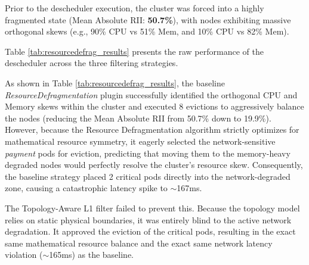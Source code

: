 Prior to the descheduler execution, the cluster was forced into a highly fragmented state (Mean Absolute RII: \textbf{50.7\%}), with nodes exhibiting massive orthogonal skews (e.g., 90\% CPU vs 51\% Mem, and 10\% CPU vs 82\% Mem).

Table \ref{tab:resourcedefrag_results} presents the raw performance of the descheduler across the three filtering strategies.
\begin{table}[H]
    \centering
    \caption{Descheduler Performance: ResourceDefragmentation Scenario}
    \label{tab:resourcedefrag_results}
\end{table}

As shown in Table \ref{tab:resourcedefrag_results}, the baseline \textit{ResourceDefragmentation} plugin successfully identified the orthogonal CPU and Memory skews within the cluster and executed 8 evictions to aggressively balance the nodes (reducing the Mean Absolute RII from 50.7\% down to 19.9\%). However, because the Resource Defragmentation algorithm strictly optimizes for mathematical resource symmetry, it eagerly selected the network-sensitive \textit{payment} pods for eviction, predicting that moving them to the memory-heavy degraded nodes would perfectly resolve the cluster's resource skew. Consequently, the baseline strategy placed 2 critical pods directly into the network-degraded zone, causing a catastrophic latency spike to $\sim$167ms. 

The Topology-Aware L1 filter failed to prevent this. Because the topology model relies on static physical boundaries, it was entirely blind to the active network degradation. It approved the eviction of the critical pods, resulting in the exact same mathematical resource balance and the exact same network latency violation ($\sim$165ms) as the baseline. 

